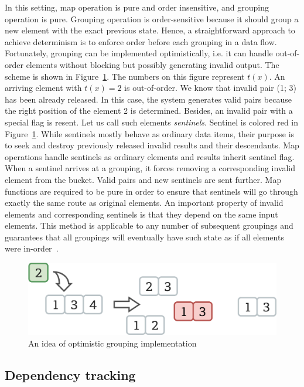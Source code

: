 In this setting, map operation is pure and order insensitive, and grouping operation is pure. Grouping operation is order-sensitive because it should group a new element with the exact previous state. Hence, a straightforward approach to achieve determinism is to enforce order before each grouping in a data flow. Fortunately, grouping can be implemented optimistically, i.e. it can handle out-of-order elements without blocking but possibly generating invalid output. The scheme is shown in Figure~\ref{optimistic-grouping}. The numbers on this figure represent $t(x)$. An arriving element with $t(x)=2$ is out-of-order. We know that invalid pair (1; 3) has been already released. In this case, the system generates valid pairs because the right position of the element 2 is determined. Besides, an invalid pair with a special flag is resent. Let us call such elements {\em sentinels}. Sentinel is colored red in Figure~\ref{optimistic-grouping}. While sentinels mostly behave as ordinary data items, their purpose is to seek and destroy previously released invalid results and their descendants. Map operations handle sentinels as ordinary elements and results inherit sentinel flag. When a sentinel arrives at a grouping, it forces removing a corresponding invalid element from the bucket. Valid pairs and new sentinels are sent further. Map functions are required to be pure in order to ensure that sentinels will go through exactly the same route as original elements. An important property of invalid elements and corresponding sentinels is that they depend on the same input elements. This method is applicable to any number of subsequent groupings and guarantees that all groupings will eventually have such state as if all elements were in-order~\cite{we2018adbis}.
 
\begin{figure}[htbp]
  \centering
  \includegraphics[width=\columnwidth]{pics/grouping-invalidation}
  \caption{An idea of optimistic grouping implementation}
  \label {optimistic-grouping}
\end{figure} 

\subsection{Dependency tracking}

